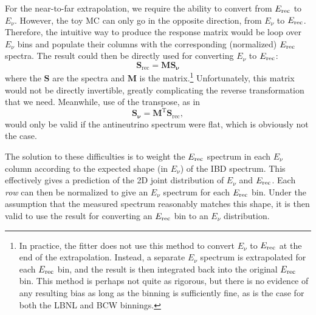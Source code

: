 \documentclass[../thesis.tex]{subfiles}
\begin{document}
For the near-to-far extrapolation, we require the ability to convert from $E_\mathrm{rec}$ to $E_\nu$. However, the toy MC can only go in the opposite direction, from $E_\nu$ to $E_\mathrm{rec}$. Therefore, the intuitive way to produce the response matrix would be loop over $E_\nu$ bins and populate their columns with the corresponding (normalized) $E_\mathrm{rec}$ spectra. The result could then be directly used for converting $E_\nu$ to $E_\mathrm{rec}$:
\begin{equation*}
  \mathbf{S_{\mathrm{rec}}} = \mathbf{M} \mathbf{S_\nu} 
\end{equation*}
where the $\mathbf{S}$ are the spectra and $\mathbf{M}$ is the matrix.\footnote{\label{foot:fitEnuToErec}In practice, the fitter does not use this method to convert $E_\nu$ to $E_\mathrm{rec}$ at the end of the extrapolation. Instead, a separate $E_\nu$ spectrum is extrapolated for each $E_\mathrm{rec}$ bin, and the result is then integrated back into the original $E_\mathrm{rec}$ bin. This method is perhaps not quite as rigorous, but there is no evidence of any resulting bias as long as the binning is sufficiently fine, as is the case for both the LBNL and BCW binnings.} Unfortunately, this matrix would not be directly invertible, greatly complicating the reverse transformation that we need. Meanwhile, use of the transpose, as in
\begin{equation*}
  \mathbf{S_\nu} = \mathbf{M^{\mathrm{T}}} \mathbf{S_{\mathrm{rec}}},
\end{equation*}
would only be valid if the antineutrino spectrum were flat, which is obviously not the case.

The solution to these difficulties is to weight the $E_\mathrm{rec}$ spectrum in each $E_\nu$ column according to the expected shape (in $E_\nu$) of the IBD spectrum. This effectively gives a prediction of the 2D joint distribution of $E_\nu$ and $E_\mathrm{rec}$. Each \emph{row} can then be normalized to give an $E_\nu$ spectrum for each $E_\mathrm{rec}$ bin. Under the assumption that the measured spectrum reasonably matches this shape, it is then valid to use the result for converting an $E_\mathrm{rec}$ bin to an $E_\nu$ distribution.

\begin{comment}
\footnote{Given that the shape is distorted both by oscillations and by differences in the fission fractions, it is important to verify that the analysis is insensitive to such variations in the spectral shape. XXX, was this done?}
\end{comment}

\begin{comment}
  We should fix genEvisToEnuMatrix.C to turn off the theta13 oscillation, and then note below that oscillations are disabled.
\end{comment}
\end{document}
